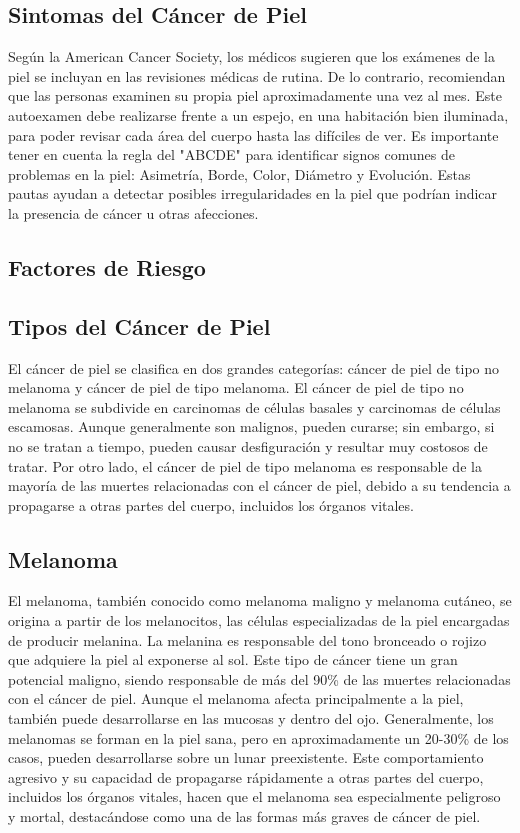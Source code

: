 \subsection{Sintomas del Cáncer de Piel}
Según la American Cancer Society, los médicos sugieren que los exámenes de la piel se incluyan en las revisiones médicas de rutina. De lo contrario, recomiendan que las personas examinen su propia piel aproximadamente una vez al mes. Este autoexamen debe realizarse frente a un espejo, en una habitación bien iluminada, para poder revisar cada área del cuerpo hasta las difíciles de ver. Es importante tener en cuenta la regla del "ABCDE" para identificar signos comunes de problemas en la piel: Asimetría, Borde, Color, Diámetro y Evolución. Estas pautas ayudan a detectar posibles irregularidades en la piel que podrían indicar la presencia de cáncer u otras afecciones.
\parencite{information_cancer}

\subsection{Factores de Riesgo}



\subsection{Tipos del Cáncer de Piel}
El cáncer de piel se clasifica en dos grandes categorías: cáncer de piel de tipo no melanoma y cáncer de piel de tipo melanoma. El cáncer de piel de tipo no melanoma se subdivide en carcinomas de células basales y carcinomas de células escamosas. Aunque generalmente son malignos, pueden curarse; sin embargo, si no se tratan a tiempo, pueden causar desfiguración y resultar muy costosos de tratar. Por otro lado, el cáncer de piel de tipo melanoma es responsable de la mayoría de las muertes relacionadas con el cáncer de piel, debido a su tendencia a propagarse a otras partes del cuerpo, incluidos los órganos vitales.

\subsection{Melanoma}
El melanoma, también conocido como melanoma maligno y melanoma cutáneo, se origina a partir de los melanocitos, las células especializadas de la piel encargadas de producir melanina. La melanina es responsable del tono bronceado o rojizo que adquiere la piel al exponerse al sol. Este tipo de cáncer tiene un gran potencial maligno, siendo responsable de más del 90\% de las muertes relacionadas con el cáncer de piel. Aunque el melanoma afecta principalmente a la piel, también puede desarrollarse en las mucosas y dentro del ojo. Generalmente, los melanomas se forman en la piel sana, pero en aproximadamente un 20-30\% de los casos, pueden desarrollarse sobre un lunar preexistente.  \parencite{cancer_tipo_melanoma}
Este comportamiento agresivo y su capacidad de propagarse rápidamente a otras partes del cuerpo, incluidos los órganos vitales, hacen que el melanoma sea especialmente peligroso y mortal, destacándose como una de las formas más graves de cáncer de piel.

